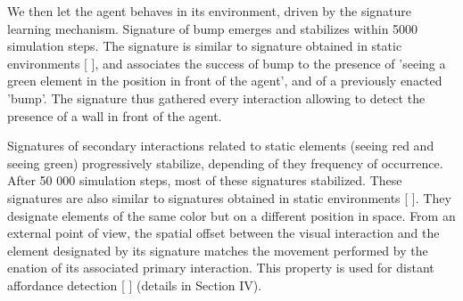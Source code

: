 \documentclass[conference]{IEEEtran}
\begin{document}





We then let the agent behaves in its environment, driven by the signature learning mechanism. Signature of bump emerges and stabilizes within 5000 simulation steps. The signature is similar to signature obtained in static environments [ ], and associates the success of bump to the presence of 'seeing a green element in the position in front of the agent', and of a previously enacted 'bump'. The signature thus gathered every interaction allowing to detect the presence of a wall in front of the agent. %

Signatures of secondary interactions related to static elements (seeing red and seeing green) progressively stabilize, depending of they frequency of occurrence. After 50 000 simulation steps, most of these signatures stabilized. These signatures are also similar to signatures obtained in static environments [ ]. They designate elements of the same color but on a different position in space. From an external point of view, the spatial offset between the visual interaction and the element designated by its signature matches the movement performed by the enation of its associated primary interaction. This property is used for distant affordance detection [ ] (details in Section IV).
\end{document}
